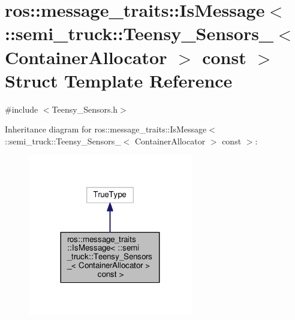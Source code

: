 \hypertarget{structros_1_1message__traits_1_1_is_message_3_01_1_1semi__truck_1_1_teensy___sensors___3_01_contee20f324312af52498809118a40cc274}{}\section{ros\+:\+:message\+\_\+traits\+:\+:Is\+Message$<$ \+:\+:semi\+\_\+truck\+:\+:Teensy\+\_\+\+Sensors\+\_\+$<$ Container\+Allocator $>$ const $>$ Struct Template Reference}
\label{structros_1_1message__traits_1_1_is_message_3_01_1_1semi__truck_1_1_teensy___sensors___3_01_contee20f324312af52498809118a40cc274}


{\ttfamily \#include $<$Teensy\+\_\+\+Sensors.\+h$>$}



Inheritance diagram for ros\+:\+:message\+\_\+traits\+:\+:Is\+Message$<$ \+:\+:semi\+\_\+truck\+:\+:Teensy\+\_\+\+Sensors\+\_\+$<$ Container\+Allocator $>$ const $>$\+:\nopagebreak
\begin{figure}[H]
\begin{center}
\leavevmode
\includegraphics[width=203pt]{structros_1_1message__traits_1_1_is_message_3_01_1_1semi__truck_1_1_teensy___sensors___3_01_cont8602985026d3fce4a20e6339888db709}
\end{center}
\end{figure}


